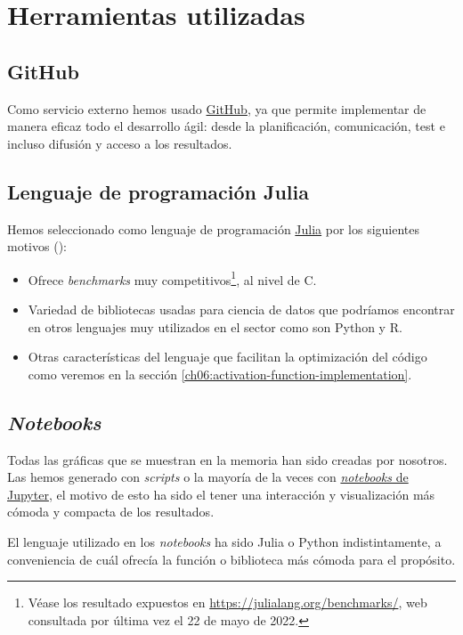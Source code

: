 
\section{Herramientas utilizadas}
\label{ch01:Herramientas}
\subsection{GitHub}
Como servicio externo hemos usado \href{https://github.com}{GitHub}, ya que permite implementar de manera eficaz
 todo el desarrollo ágil: 
desde la planificación, comunicación, test e incluso difusión y acceso a los resultados. 

\subsection{Lenguaje de programación Julia}
Hemos seleccionado como lenguaje de programación \href{https://julialang.org}{Julia} 
por los siguientes motivos (\cite{virtudes-de-julia}): 
\begin{itemize}
    \item Ofrece \textit{benchmarks} 
    muy competitivos\footnote{Véase los resultado expuestos en 
    \url{https://julialang.org/benchmarks/}, 
    web consultada por última vez el 22 de mayo de 2022.},
    al nivel de C.
    \item Variedad de bibliotecas usadas para ciencia de datos que podríamos encontrar 
    en otros lenguajes muy utilizados en el sector como son Python y R. 
    \item Otras características del lenguaje que facilitan 
    la optimización del código como veremos en la sección \ref{ch06:activation-function-implementation}. 
\end{itemize}

\subsection{\textit{Notebooks}}

Todas las gráficas que se muestran en la memoria han sido creadas por nosotros. 
Las hemos generado con \textit{scripts} o la mayoría de la veces con 
\href{https://jupyter.org}{\textit{notebooks} de Jupyter}, el motivo de esto ha 
sido el tener una interacción y visualización más cómoda y compacta de los resultados.

El lenguaje utilizado en los \textit{notebooks} ha sido Julia o Python indistintamente,
a conveniencia de cuál ofrecía la función o biblioteca más cómoda para el propósito.  


 